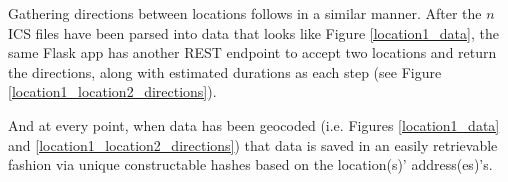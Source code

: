 \documentclass[letterpaper,11pt]{report}
\theoremstyle{definition}
\theoremstyle{definition}
\begin{document}
Gathering directions between locations follows in a similar manner. After the $n$ ICS files have been parsed into data that looks like Figure \ref{location1_data}, the same Flask app has another REST endpoint to accept two locations and return the directions, along with estimated durations as each step (see Figure \ref{location1_location2_directions}).

And at every point, when data has been geocoded (i.e. Figures \ref{location1_data} and \ref{location1_location2_directions}) that data is saved in an easily retrievable fashion via unique constructable hashes based on the location(s)' address(es)'s.








\end{document}
